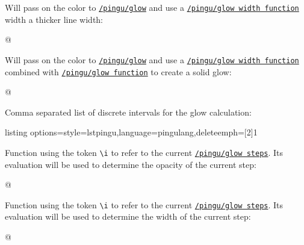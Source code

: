 \documentclass[parskip=half,english,numbers=noenddot,footnotes=nomultiple,oneside]{scrartcl}
\makeatletter
\def\lpingu#1{\lstinline[style=lstpingu,language=pingulang]'#1'}
\newcommand*\keyref[2][/pingu/]{\hyperref[pk:#1#2]{\lpingu{#1#2}}}
\edef\i{\number\count@}\relax
\makeatother
\begin{document}
Will pass on the color to \keyref{glow} and use a \keyref{glow width function} width a thicker line width:
\begin{tcblisting}{@}
\begin{tikzpicture}
	\pingu[glow thick=green]
\end{tikzpicture}
\end{tcblisting}
\endkeyexplain

Will pass on the color to \keyref{glow} and use a \keyref{glow width function} combined with \keyref{glow function} to create a solid glow:
\begin{tcblisting}{@}
\begin{tikzpicture}
	\pingu[glow solid=green, wings wave]
\end{tikzpicture}
\end{tcblisting}
\endkeyexplain

	Comma separated list of discrete intervals for the glow calculation:
\begin{tcblisting}{listing options={style=lstpingu,language=pingulang,deleteemph={[2]{1}}}}
\begin{tikzpicture}
	\pingu[glow=green, glow steps={.3,.5,1}]
\end{tikzpicture}
\end{tcblisting}
\endsubkeyexplain

{\def\i{\textbackslash i~}%
	Function using the token \lpingu{\i} to refer to the current \keyref{glow steps}. Its evaluation will be used to determine the opacity of the current step:
\begin{tcblisting}{@}
\begin{tikzpicture}
	\pingu[glow=green,
	       glow function={.5/\i}]
\end{tikzpicture}
\end{tcblisting}
\endsubkeyexplain}

{\def\i{\textbackslash i~}%
	Function using the token \lpingu{\i} to refer to the current \keyref{glow steps}. Its evaluation will be used to determine the width of the current step:
\begin{tcblisting}{@}
\begin{tikzpicture}
	\pingu[glow=green,
	  glow width function={5mm-\i mm}]
\end{tikzpicture}
\end{tcblisting}
\endsubkeyexplain}
\end{document}
